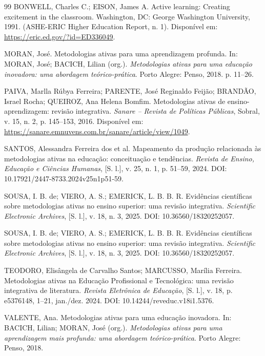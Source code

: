 \begin{thebibliography}{99}
BONWELL, Charles C.; EISON, James A. Active learning: Creating excitement in the classroom. Washington, DC: George Washington University, 1991. (ASHE-ERIC Higher Education Report, n. 1). Disponível em: \url{https://eric.ed.gov/?id=ED336049}.

MORAN, José. Metodologias ativas para uma aprendizagem profunda. In: MORAN, José; BACICH, Lilian (org.). \textit{Metodologias ativas para uma educação inovadora: uma abordagem teórico-prática}. Porto Alegre: Penso, 2018. p. 11--26.

PAIVA, Marlla Rúbya Ferreira; PARENTE, José Reginaldo Feijão; BRANDÃO, Israel Rocha; QUEIROZ, Ana Helena Bomfim. Metodologias ativas de ensino-aprendizagem: revisão integrativa. \textit{Sanare -- Revista de Políticas Públicas}, Sobral, v. 15, n. 2, p. 145--153, 2016. Disponível em: \url{https://sanare.emnuvens.com.br/sanare/article/view/1049}.

SANTOS, Alessandra Ferreira dos et al. Mapeamento da produção relacionada às metodologias ativas na educação: conceituação e tendências. \textit{Revista de Ensino, Educação e Ciências Humanas}, [S. l.], v. 25, n. 1, p. 51--59, 2024. DOI: 10.17921/2447-8733.2024v25n1p51-59.

SOUSA, I. B. de; VIERO, A. S.; EMERICK, L. B. B. R. Evidências científicas sobre metodologias ativas no ensino superior: uma revisão integrativa. \textit{Scientific Electronic Archives}, [S. l.], v. 18, n. 3, 2025. DOI: 10.36560/18320252057.

SOUSA, I. B. de; VIERO, A. S.; EMERICK, L. B. B. R. Evidências científicas sobre metodologias ativas no ensino superior: uma revisão integrativa. \textit{Scientific Electronic Archives}, [S. l.], v. 18, n. 3, 2025. DOI: 10.36560/18320252057.

TEODORO, Elisângela de Carvalho Santos; MARCUSSO, Marília Ferreira. Metodologias ativas na Educação Profissional e Tecnológica: uma revisão integrativa de literatura. \textit{Revista Eletrônica de Educação}, [S. l.], v. 18, p. e5376148, 1--21, jan./dez. 2024. DOI: 10.14244/reveduc.v18i1.5376.

VALENTE, Ana. Metodologias ativas para uma educação inovadora. In: BACICH, Lilian; MORAN, José (org.). \textit{Metodologias ativas para uma aprendizagem mais profunda: uma abordagem teórico-prática}. Porto Alegre: Penso, 2018.



\end{thebibliography}
